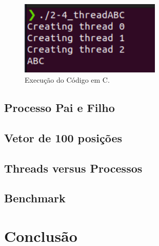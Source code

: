 \documentclass[
	12pt,				%
	openright,			%
	oneside,			%
	a4paper,			%
	chapter=TITLE,		%
	english,			%
	french,				%
	spanish,			%
	brazil				%
	]{abntex2}
\theoremstyle{definition}
\begin{document}
\begin{figure}
    \centering
    \includegraphics[width=0.6\textwidth]{imagens/run_processos_4.png}
    \caption{Execução do Código em C.}
    \label{fig:run4}
\end{figure}
\section{Processo Pai e Filho}

\section{Vetor de 100 posições}

\section{Threads versus Processos}

\section{Benchmark}

\chapter{Conclusão}
\label{conclusao}





\postextual



\cite{tanenbaum2010sistemas}
\end{document}
